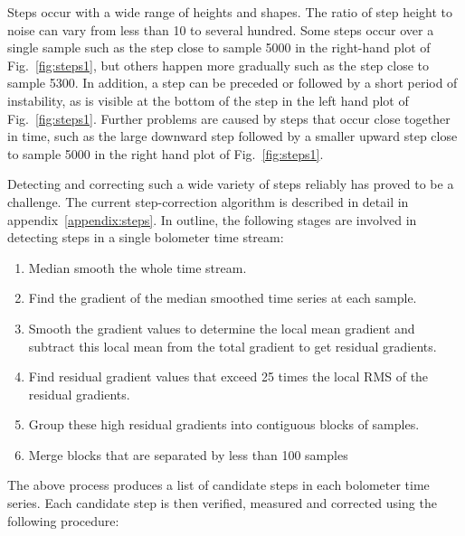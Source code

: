 \documentclass[useAMS,usenatbib,nofootinbib]{mn2e}
\begin{document}
Steps occur with a wide range of heights and shapes. The ratio of step
height to noise can vary from less than 10 to several hundred. Some steps
occur over a single sample such as the step close to sample 5000 in the
right-hand plot of Fig.~\ref{fig:steps1}, but others happen more
gradually such as the step close to sample 5300. In addition, a step can
be preceded or followed by a short period of instability, as is visible
at the bottom of the step in the left hand plot of
Fig.~\ref{fig:steps1}. Further problems are caused by steps that occur
close together in time, such as the large downward step followed by a
smaller upward step close to sample 5000 in the right hand plot of
Fig.~\ref{fig:steps1}.

Detecting and correcting such a wide variety of steps reliably has proved
to be a challenge. The current step-correction algorithm is described in
detail in appendix~\ref{appendix:steps}. In outline, the following stages
are involved in detecting steps in a single bolometer time stream:

\begin{enumerate}
\item Median smooth the whole time stream.
\item Find the gradient of the median smoothed time series at each sample.
\item Smooth the gradient values to determine the local mean gradient and
subtract this local mean from the total gradient to get residual gradients.
\item Find residual gradient values that exceed 25 times the local RMS of
the residual gradients.
\item Group these high residual gradients into contiguous blocks of
samples.
\item Merge blocks that are separated by less than 100 samples
\end{enumerate}

The above process produces a list of candidate steps in each bolometer
time series. Each candidate step is then verified, measured and corrected
using the following procedure:
\end{document}
